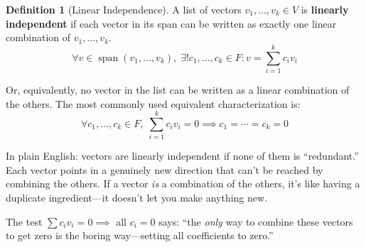 \documentclass[11pt]{article}
\theoremstyle{definition}
\newtheorem{definition}{Definition}[section]
\theoremstyle{plain}
\theoremstyle{remark}
\DeclareMathOperator{\spn}{span}
\begin{document}
\begin{definition}[Linear Independence]
A list of vectors $v_1, \ldots, v_k \in V$ is \textbf{linearly independent} if each vector in its span can be written as exactly one linear combination of $v_1, \ldots, v_k$.
\[
\forall v \in \spn(v_1, \ldots, v_k),\; \exists! c_1, \ldots, c_k \in F : v = \sum_{i=1}^{k} c_i v_i
\]
\end{definition}

Or, equivalently, no vector in the list can be written as a linear combination of the others. The most commonly used equivalent characterization is:
\[
\forall c_1, \ldots, c_k \in F,\; \sum_{i=1}^{k} c_i v_i = 0 \implies c_1 = \cdots = c_k = 0
\]

\begin{intuitionbox}
In plain English: vectors are linearly independent if none of them is ``redundant.'' Each vector points in a genuinely new direction that can't be reached by combining the others. If a vector \textit{is} a combination of the others, it's like having a duplicate ingredient---it doesn't let you make anything new.

The test $\sum c_i v_i = 0 \implies $ all $c_i = 0$ says: ``the \textit{only} way to combine these vectors to get zero is the boring way---setting all coefficients to zero.''
\end{intuitionbox}
\end{document}
